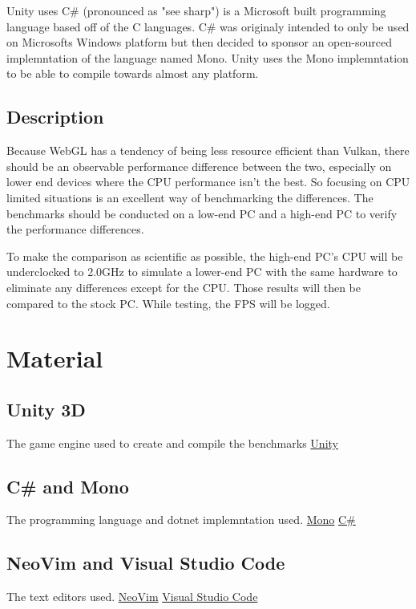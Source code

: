 \documentclass{article}
\begin{document}
Unity uses C\# (pronounced as "see sharp") is a Microsoft built programming language based off of the C languages. C\# was originaly intended to only be used on Microsofts Windows platform but then decided to sponsor an open-sourced implemntation of the language named Mono\cite{CSharpWiki}. Unity uses the Mono implemntation to be able to compile towards almost any platform.


\subsection {Description}
Because WebGL has a tendency of being less resource efficient than Vulkan, there should be an observable performance difference between the two, especially on lower end devices where the CPU performance isn’t the best. So focusing on CPU limited situations is an excellent way of benchmarking the differences. The benchmarks should be conducted on a low-end PC and a high-end PC to verify the performance differences. \par
To make the comparison as scientific as possible, the high-end PC’s CPU will be underclocked to 2.0GHz to simulate a lower-end PC with the same hardware to eliminate any differences except for the CPU. Those results will then be compared to the stock PC. While testing, the FPS will be logged.



\section {Material}
\subsection* {Unity 3D}
The game engine used to create and compile the benchmarks
\newline\href{https://unity.com}{Unity}

\subsection* {C\# and Mono}
The programming language and dotnet implemntation used.
\newline\href{https://www.mono-project.com/}{Mono}
\newline\href{https://docs.microsoft.com/en-us/dotnet/csharp/}{C\#}

\subsection* {NeoVim and Visual Studio Code}
The text editors used.
\newline\href{https://neovim.io/}{NeoVim}
\newline\href{https://code.visualstudio.com/}{Visual Studio Code}
\end{document}
